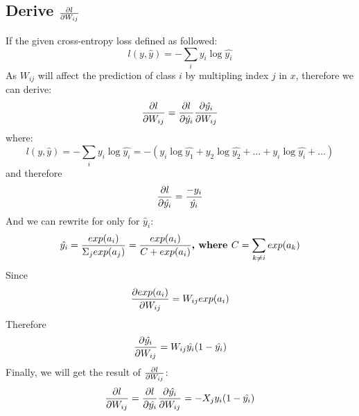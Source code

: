 \documentclass{article}
\begin{document}
\subsection{Derive ${\partial l\over \partial W_{ij}}$}
If the given cross-entropy loss defined as followed:
\begin{equation}
l(y, \hat{y}) = -\sum_i y_i\log\hat{y_i}
\end{equation}
As $W_{ij}$ will affect the prediction of class $i$ by multipling index $j$ in $x$, therefore we can derive:
\begin{equation}
{\partial l\over \partial W_{ij}} = {\partial l \over \partial \hat{y_i}} {\partial \hat{y_i} \over \partial W_{ij}}
\end{equation}
where:
\begin{equation}
l(y, \hat{y}) = -\sum_i y_i\log\hat{y_i} = -(y_i\log\hat{y_1} + y_2\log\hat{y_2} + \dots + y_i\log\hat{y_i} + \dots)
\end{equation}
and therefore
\begin{equation}
{\partial l \over \partial \hat{y_i}} = {-y_i\over \hat{y_i}}
\end{equation}
And we can rewrite for only for $\hat y_i$:
\begin{equation}
\hat{y_i} = {exp(a_i) \over \Sigma_j exp(a_j)} = {exp(a_i) \over C + exp(a_i)} \textbf{,  where $C = \sum_{k\neq i} exp(a_k)$}
\end{equation}
Since
\begin{equation}
{\partial exp(a_i) \over \partial W_{ij}} = W_{ij}exp(a_i)
\end{equation}
Therefore
\begin{equation}
{\partial \hat{y_i} \over \partial W_{ij}} = W_{ij}\hat{y_i}(1-\hat{y_i})
\end{equation}
Finally, we will get the result of ${\partial l\over \partial W_{ij}}$:
\begin{equation}
{\partial l\over \partial W_{ij}} = {\partial l \over \partial \hat{y_i}} {\partial \hat{y_i} \over \partial W_{ij}} = -X_jy_i(1- \hat{y_i})
\end{equation}
\end{document}
